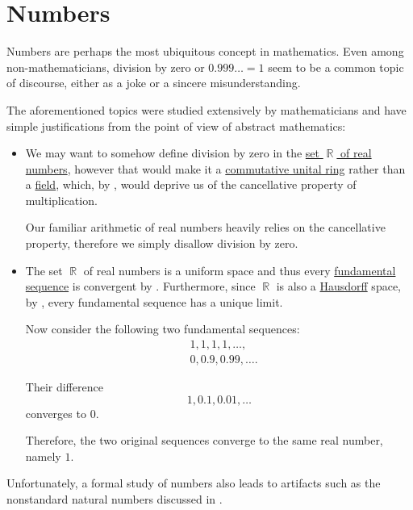\section{Numbers}\label{sec:numbers}

Numbers are perhaps the most ubiquitous concept in mathematics. Even among non-mathematicians, division by zero or \( 0.999\ldots = 1 \) seem to be a common topic of discourse, either as a joke or a sincere misunderstanding.

The aforementioned topics were studied extensively by mathematicians and have simple justifications from the point of view of abstract mathematics:
\begin{itemize}
  \item We may want to somehow define division by zero in the \hyperref[def:set_of_real_numbers]{set \( \BbbR \) of real numbers}, however that would make it a \hyperref[def:ring/commutative]{commutative unital ring} rather than a \hyperref[def:field]{field}, which, by , would deprive us of the cancellative property of multiplication.

  Our familiar arithmetic of real numbers heavily relies on the cancellative property, therefore we simply disallow division by zero.

  \item The set \( \BbbR \) of real numbers is a uniform space and thus every \hyperref[def:fundamental_net]{fundamental sequence} is convergent by . Furthermore, since \( \BbbR \) is also a \hyperref[def:separation_axioms/T2]{Hausdorff} space, by , every fundamental sequence has a unique limit.

  Now consider the following two fundamental sequences:
  \begin{align*}
    &1, 1, 1, 1, \ldots, \\
    &0, 0.9, 0.99, \ldots.
  \end{align*}

  Their difference
  \begin{equation*}
    1, 0.1, 0.01, \ldots
  \end{equation*}
  converges to \( 0 \).

  Therefore, the two original sequences converge to the same real number, namely \( 1 \).
\end{itemize}

Unfortunately, a formal study of numbers also leads to artifacts such as the nonstandard natural numbers discussed in .

